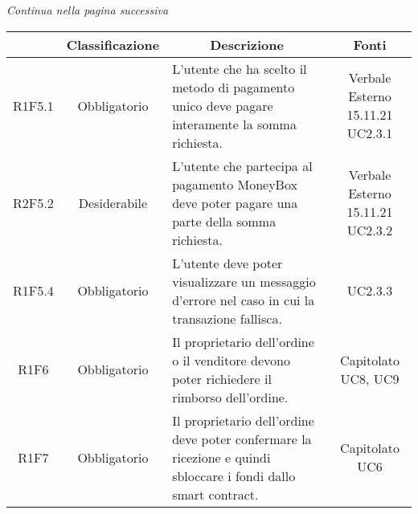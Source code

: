 \begin{center}
    \textit{\small Continua nella pagina successiva}
\end{center}
\begin{table}[H]
    \centering
    \renewcommand{\arraystretch}{1.8}
    \begin{tabular}{c | c | p{6cm} | c}
        \rowcolor[HTML]{125E28}
        \multicolumn{1}{c}{\color[HTML]{FFFFFF} \textbf{Codice}}          &
        \multicolumn{1}{c}{\color[HTML]{FFFFFF} \textbf{Classificazione}} &
        \multicolumn{1}{c}{\color[HTML]{FFFFFF} \textbf{Descrizione}}     &
        \multicolumn{1}{c}{\color[HTML]{FFFFFF} \textbf{Fonti}}                                                                                                                                                                                              \\
        \hline
        R1F5.1                                                            & Obbligatorio & L'utente che ha scelto il metodo di pagamento unico deve pagare interamente la somma richiesta.                       & \Shortunderstack{Verbale Esterno 15.11.21 \\UC2.3.1\\}      \\
        R2F5.2                                                            & Desiderabile & L'utente che partecipa al pagamento MoneyBox\glo{} deve poter pagare una parte della somma richiesta.                 & \Shortunderstack{Verbale Esterno 15.11.21 \\UC2.3.2\\}      \\
        R1F5.4                                                            & Obbligatorio & L'utente deve poter visualizzare un messaggio d'errore nel caso in cui la transazione fallisca.                       & UC2.3.3                                   \\
        R1F6                                                              & Obbligatorio & Il proprietario dell'ordine o il venditore devono poter richiedere il rimborso dell'ordine.                           & \Shortunderstack{Capitolato               \\UC8, UC9\\}   \\
        R1F7                                                              & Obbligatorio & Il proprietario dell'ordine deve poter confermare la ricezione e quindi sbloccare i fondi dallo smart contract\glo{}. & \Shortunderstack{Capitolato               \\UC6\\}   \\

\end{tabular}
\end{table}
